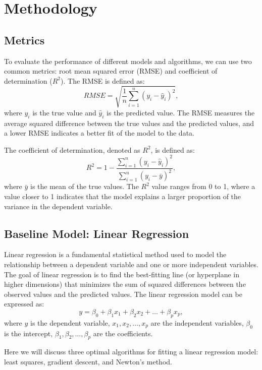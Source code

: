 \documentclass{article}
\begin{document}
\section{Methodology}
\label{sec:methodology}
\subsection{Metrics}
\label{sec:metrics}
To evaluate the performance of different models and algorithms, we can use two common metrics: root mean squared error (RMSE) and coefficient of determination ($R^2$).
The RMSE is defined as:
\begin{equation}
    RMSE = \sqrt{\frac{1}{n} \sum_{i=1}^{n} (y_i - \hat{y}_i)^2},
\end{equation}
where $y_i$ is the true value and $\hat{y}_i$ is the predicted value.
The RMSE measures the average squared difference between the true values and the predicted values,
and a lower RMSE indicates a better fit of the model to the data.

The coefficient of determination, denoted as $R^2$, is defined as:
\begin{equation}
    R^2 = 1 - \frac{\sum_{i=1}^{n} (y_i - \hat{y}_i)^2}{\sum_{i=1}^{n} (y_i - \bar{y})^2},
\end{equation}
where $\bar{y}$ is the mean of the true values. The $R^2$ value ranges from 0 to 1, where a value closer to 1
indicates that the model explains a larger proportion of the variance in the dependent variable.

\subsection{Baseline Model: Linear Regression}
Linear regression is a fundamental statistical method used to model the relationship between a dependent variable 
and one or more independent variables. The goal of linear regression is to find the best-fitting line (or hyperplane in higher dimensions) 
that minimizes the sum of squared differences between the observed values and the predicted values. 
The linear regression model can be expressed as:
\begin{equation}
    y = \beta_0 + \beta_1 x_1 + \beta_2 x_2 + \ldots + \beta_p x_p,
\end{equation}
where $y$ is the dependent variable, $x_1, x_2, \ldots, x_p$ are the independent variables, $\beta_0$ is the intercept,
 $\beta_1, \beta_2, \ldots, \beta_p$ are the coefficients.

Here we will discuss three optimal algorithms for fitting a linear regression model: least squares, gradient descent, and Newton's method.
\end{document}
